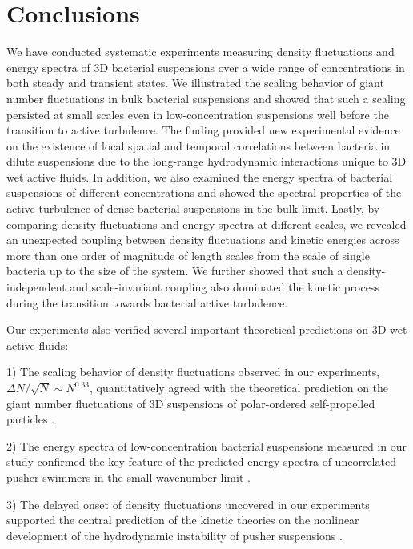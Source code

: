 \documentclass[twocolumn,aps,prx,amsmath,amssymb,longbibliography,superscriptaddress]{revtex4-2}
\begin{document}
\section{Conclusions}

We have conducted systematic experiments measuring density fluctuations and energy spectra of 3D bacterial suspensions over a wide range of concentrations in both steady and transient states. We illustrated the scaling behavior of giant number fluctuations in bulk bacterial suspensions and showed that such a scaling persisted at small scales even in low-concentration suspensions well before the transition to active turbulence. The finding provided new experimental evidence on the existence of local spatial and temporal correlations between bacteria in dilute suspensions due to the long-range hydrodynamic interactions unique to 3D wet active fluids. In addition, we also examined the energy spectra of bacterial suspensions of different concentrations and showed the spectral properties of the active turbulence of dense bacterial suspensions in the bulk limit. Lastly, by comparing density fluctuations and energy spectra at different scales, we revealed an unexpected coupling between density fluctuations and kinetic energies across more than one order of magnitude of length scales from the scale of single bacteria up to the size of the system. We further showed that such a density-independent and scale-invariant coupling also dominated the kinetic process during the transition towards bacterial active turbulence.

Our experiments also verified several important theoretical predictions on 3D wet active fluids:

1) The scaling behavior of density fluctuations observed in our experiments, $\Delta N/\sqrt N \sim N^{0.33}$, quantitatively agreed with the theoretical prediction on the giant number fluctuations of 3D suspensions of polar-ordered self-propelled particles \cite{AditiSimha2002}.

2) The energy spectra of low-concentration bacterial suspensions measured in our study confirmed the key feature of the predicted energy spectra of uncorrelated pusher swimmers in the small wavenumber limit \cite{Bardfalvy2019}.

3) The delayed onset of density fluctuations uncovered in our experiments supported the central prediction of the kinetic theories on the nonlinear development of the hydrodynamic instability of pusher suspensions \cite{Saintillan2008a, Saintillan2008b}.
\end{document}
